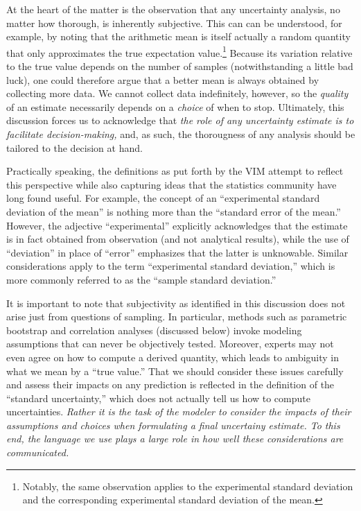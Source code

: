 At the heart of the matter is the observation that any uncertainty analysis, no matter how thorough, is inherently subjective.  This can can be understood, for example, by noting that the arithmetic mean is itself actually a random quantity that only approximates the true expectation value.\footnote{Notably, the same observation applies to the experimental standard deviation and the corresponding experimental standard deviation of the mean.}  Because its variation relative to the true value depends on the number of samples (notwithstanding a little bad luck), one could therefore argue that a better mean is always obtained by collecting more data.   We cannot collect data indefinitely, however, so the {\it quality} of an estimate necessarily depends on a {\it choice} of when to stop.  Ultimately, this discussion forces us to acknowledge that {\it the role of any uncertainty estimate is to facilitate decision-making,} and, as such, the thorougness of any analysis should be tailored to the decision at hand.  

Practically speaking, the definitions as put forth by the VIM attempt to reflect this perspective while also capturing ideas that the statistics community have long found useful.  For example, the concept of an ``experimental standard deviation of the mean'' is nothing more than the ``standard error of the mean.''  However, the adjective ``experimental'' explicitly acknowledges that the estimate is in fact obtained from observation (and not analytical results), while the use of ``deviation'' in place of ``error'' emphasizes that the latter is unknowable.  Similar considerations apply to the term ``experimental standard deviation,'' which is more commonly referred to as the ``sample standard deviation.''

It is important to note that subjectivity as identified in this discussion does not arise just from questions of sampling. In particular, methods such as parametric bootstrap and correlation analyses (discussed below) invoke modeling assumptions that can never be objectively tested.  Moreover, experts may not even agree on how to compute a derived quantity, which leads to ambiguity in what we mean by a ``true value.''\cite{patrone1}  That we should consider these issues carefully and assess their impacts on any prediction is reflected in the definition of the ``standard uncertainty,'' which does not actually tell us how to compute uncertainties.  {\it Rather it is the task of the modeler to consider the impacts of their assumptions and choices when formulating a final uncertainy estimate.  To this end, the language we use plays a large role in how well these considerations are communicated.}

